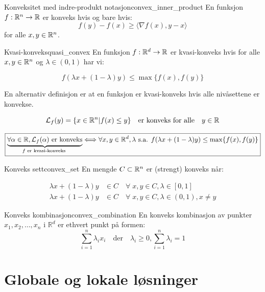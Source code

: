 \begin{remark}{Konveksitet med indre-produkt notasjon}{convex_inner_product}
  En funksjon  \(f: \mathbb{R}^n \to \mathbb{R}\) er konveks hvis og bare hvis:
  \[
    f(y) - f(x) \geq  \langle \nabla f(x), y - x \rangle
  \]
  for alle  \(x, y \in \mathbb{R}^n\).
\end{remark}


\begin{remark}{Kvasi-konveks}{quasi_convex}
  En funksjon \(f: \mathbb{R}^d \to \mathbb{R}\) er kvasi-konveks hvis for alle \(x, y \in \mathbb{R}^n\) og \(\lambda \in (0, 1)\) har vi:

  \[
    f(\lambda x + (1 - \lambda)y) \leq \max\{f(x), f(y)\}
  \]

  En alternativ definisjon er at en funksjon er kvasi-konveks hvis alle nivåsettene er konvekse.

  \[
    \mathcal{L}_f(y) = \{x \in \mathbb{R}^n | f(x) \leq y\} \quad \text{er konveks for alle} \quad y \in \mathbb{R}
  \]

  \[
    \boxed{\underbrace{\forall \alpha \in \mathbb{R}, \mathcal{L}_f(\alpha) \text{ er konveks}}_{f \text{ er kvasi-konveks }}\Longleftrightarrow \forall x, y \in \mathbb{R}^d,\lambda \text{ s.a. } f(\lambda x + (1-\lambda)y) \leq \max \{ f(x), f(y) \}}
  \]
\end{remark}

\begin{definition}{Konveks sett}{convex_set}
  En mengde \(C \subset \mathbb{R}^n\) er (strengt) konveks når:

  \begin{align*}
    \lambda x + (1 - \lambda)y & \in C \quad \forall \; x, y \in C, \lambda \in [0, 1] \tag{Konveks}                   \\
    \lambda x + (1 - \lambda)y & \in C \quad \forall \; x, y \in C, \lambda \in (0, 1), x \neq y \tag{Strengt konveks}
  \end{align*}

\end{definition}

\begin{definition}{Konveks kombinasjon}{convex_combination}
  En konveks kombinasjon av punkter $x_1, x_2, \ldots, x_n$ i $\mathbb{R}^d$ er ethvert punkt på formen:
  \[
    \sum_{i=1}^n \lambda_i x_i \quad \text{der} \quad \lambda_i \geq 0, \sum_{i=1}^n \lambda_i = 1
  \]
\end{definition}

\section{Globale og lokale løsninger}

